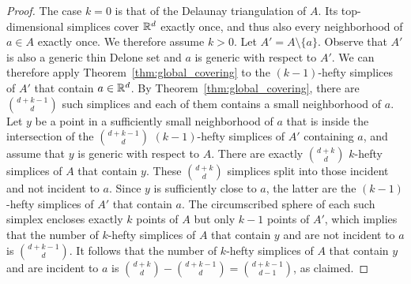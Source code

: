 \documentclass[10pt,a4paper]{article}
\newcommand {\mm}[1] {\ifmmode{#1}\else{\mbox{\(#1\)}}\fi}
\theoremstyle{plain}
\newcommand{\Rspace}        {\mm{{\mathbb R}}}
\begin{document}
\begin{proof}
  The case $k=0$ is that of the Delaunay triangulation of $A$.
  Its top-dimensional simplices cover $\Rspace^d$ exactly once, and thus also every neighborhood of $a \in A$ exactly once.
  We therefore assume $k > 0$. 
  Let $A' = A \setminus \{a\}$.
  Observe that $A'$ is also a generic thin Delone set and $a$ is generic with respect to $A'$.
  We can therefore apply Theorem~\ref{thm:global_covering} to the $(k-1)$-hefty simplices of $A'$ that contain $a \in \Rspace^d$.
  By Theorem~\ref{thm:global_covering}, there are $\binom{d+k-1}{d}$ such simplices and each of them contains a small neighborhood of $a$.
  \smallskip
  Let $y$ be a point in a sufficiently small neighborhood of $a$ that is inside the intersection of the $\binom{d+k-1}{d}$ $(k-1)$-hefty simplices of $A'$ containing $a$, and assume that $y$ is generic with respect to $A$.
  There are exactly $\binom{d+k}{d}$ $k$-hefty simplices of $A$ that contain $y$.
  These $\binom{d+k}{d}$ simplices split into those incident and not incident to $a$.
  Since $y$ is sufficiently close to $a$, the latter are the $(k-1)$-hefty simplices of $A'$ that contain $a$.
  The circumscribed sphere of each such simplex encloses exactly $k$ points of $A$ but only $k-1$ points of $A'$, which implies that the number of $k$-hefty simplices of $A$ that contain $y$ and are not incident to $a$ is $\binom{d+k-1}{d}$.
  It follows that the number of $k$-hefty simplices of $A$ that contain $y$ and are incident to $a$ is $\binom{d+k}{d}-\binom{d+k-1}{d}=\binom{d+k-1}{d-1}$, as claimed.
\end{proof}
\end{document}
